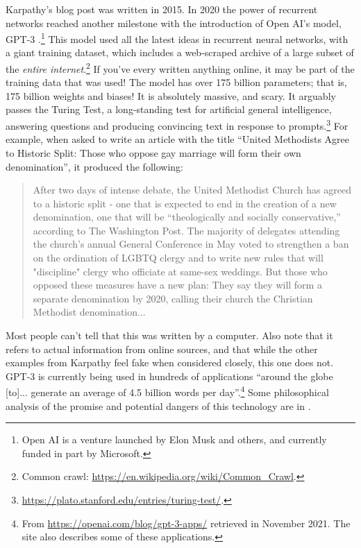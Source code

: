 Karpathy's blog post was written in 2015. In 2020 the power of recurrent networks reached another milestone with the introduction of Open AI's model, GPT-3 \cite{brown2020language, floridi2020gpt}.\footnote{Open AI is a venture launched by Elon Musk and others, and currently funded in part by Microsoft.} This model used all the latest ideas in recurrent neural networks, with a giant training dataset, which includes a web-scraped archive of a large subset of the \emph{entire internet}.\footnote{Common crawl: \url{https://en.wikipedia.org/wiki/Common_Crawl}.} If you've every written anything online, it may be part of the training data that was used! The model has over 175 billion parameters; that is, 175 billion weights and biases! It is absolutely massive, and scary. It arguably passes the Turing Test, a long-standing test for artificial general intelligence, answering questions and producing convincing  text in response to prompts.\footnote{\url{https://plato.stanford.edu/entries/turing-test/}.} For example, when asked to write an article with the title ``United Methodists Agree to Historic Split: Those who oppose gay marriage will form their own denomination'', it produced the following:
\begin{quote}
After two days of intense debate, the United Methodist Church has agreed to a historic split - one that is expected to end in the creation of a new denomination, one that will be ``theologically and socially conservative,'' according to The Washington Post. The majority of delegates attending the church's annual General Conference in May voted to strengthen a ban on the ordination of LGBTQ clergy and to write new rules that will "discipline" clergy who officiate at same-sex weddings. But those who opposed these measures have a new plan: They say they will form a separate denomination by 2020, calling their church the Christian Methodist denomination...
\end{quote}
Most people can't tell that this was written by a computer. Also note that it refers to actual information from online sources,  and that while the other examples from Karpathy feel fake when considered closely, this one does not. GPT-3 is currently being used in hundreds of applications ``around the globe [to]... generate an average of 4.5 billion words per day''.\footnote{From \url{https://openai.com/blog/gpt-3-apps/} retrieved in November 2021. The site also describes some of these applications.} Some philosophical analysis of the promise and potential dangers of this technology are in \cite{floridi2020gpt}.


